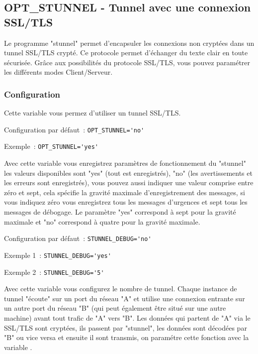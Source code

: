 \subsection{OPT\_STUNNEL - Tunnel avec une connexion SSL/TLS}

Le programme "stunnel" permet d'encapsuler les connexions non cryptées dans un tunnel
SSL/TLS crypté. Ce protocole permet d'échanger du texte clair en toute sécurisée. Grâce
aux possibilités du protocole SSL/TLS, vous pouvez paramétrer les différents modes
Client/Serveur.

\subsubsection{Configuration}
\begin{description}


Cette variable vous permez d'utiliser un tunnel SSL/TLS.

Configuration par défaut~: \verb+OPT_STUNNEL='no'+

Exemple~: \verb+OPT_STUNNEL='yes'+


Avec cette variable vous enregistrez paramètres de fonctionnement du "stunnel" les valeurs
disponibles sont "yes" (tout est enregistrés), "no" (les avertissements et les erreurs sont
enregistrés), vous pouvez aussi indiquer une valeur comprise entre zéro et sept, cela spécifie
la gravité maximale d'enregistrement des messages, si vous indiquez zéro vous enregistrez tous
les messages d'urgences et sept tous les messages de débogage. Le paramètre "yes" correspond
à sept pour la gravité maximale et "no" correspond à quatre pour la gravité maximale.

Configuration par défaut~: \verb+STUNNEL_DEBUG='no'+

Exemple 1~: \verb+STUNNEL_DEBUG='yes'+

Exemple 2~: \verb+STUNNEL_DEBUG='5'+


Avec cette variable vous configurez le nombre de tunnel. Chaque instance de tunnel "écoute"
sur un port du réseau "A" et utilise une connexion entrante sur un autre port du réseau "B"
(qui peut également être situé sur une autre machine) avant tout trafic de "A" vers "B".
Les données qui partent de "A" via le SSL/TLS sont cryptées, ils passent par "stunnel",
les données sont décodées par "B" ou vice versa et ensuite il sont transmis, on paramétre cette
fonction avec la variable .


\end{description}
